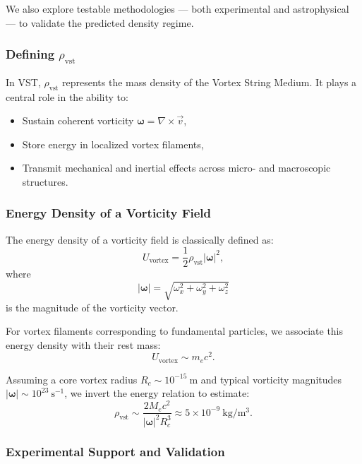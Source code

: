 \documentclass[11pt]{article}
\begin{document}
    We also explore testable methodologies — both experimental and astrophysical — to validate the predicted density regime.

    \subsubsection*{Defining \texorpdfstring{$\rho_\text{vst}$}{rho\_vst}}

    In VST, \( \rho_\text{vst} \) represents the mass density of the Vortex String Medium. It plays a central role in the ability to:

    \begin{itemize}
        \item Sustain coherent vorticity \( \boldsymbol{\omega} = \nabla \times \vec{v} \),
        \item Store energy in localized vortex filaments,
        \item Transmit mechanical and inertial effects across micro- and macroscopic structures.
    \end{itemize}

    \subsubsection*{Energy Density of a Vorticity Field}

    The energy density of a vorticity field is classically defined as:
    \[
        U_\text{vortex} = \frac{1}{2} \rho_\text{vst} |\boldsymbol{\omega}|^2,
    \]
    where
    \[
        |\boldsymbol{\omega}| = \sqrt{\omega_x^2 + \omega_y^2 + \omega_z^2}
    \]
    is the magnitude of the vorticity vector.

    For vortex filaments corresponding to fundamental particles, we associate this energy density with their rest mass:
    \[
        U_\text{vortex} \sim m_e c^2.
    \]

    Assuming a core vortex radius \( R_c \sim 10^{-15}~\mathrm{m} \) and typical vorticity magnitudes \( |\boldsymbol{\omega}| \sim 10^{23}~\mathrm{s}^{-1} \), we invert the energy relation to estimate:
    \[
        \rho_\text{vst} \sim \frac{2 M_e c^2}{|\boldsymbol{\omega}|^2 R_c^3} \approx 5 \times 10^{-9}~\mathrm{kg/m^3}.
    \]

    \subsubsection*{Experimental Support and Validation}
\end{document}
